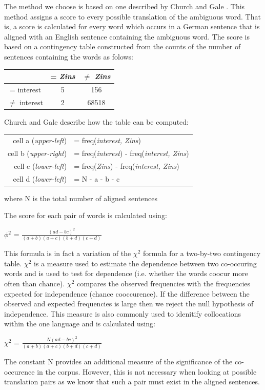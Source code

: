 \documentclass[a4wide,10pt]{article}
\begin{document}
The method we choose is based on one described by 
Church and Gale \cite{gale91word}. 
This method assigns a score to every possible translation of the ambiguous
word. That is, a score is calculated for every word which occurs in a German
sentence that is aligned with an English sentence containing the ambiguous 
word. The score is based on a contingency table constructed from the counts 
of the number of sentences containing the words as folows:

\begin{center}
\begin{tabular}{|c|c|c|}
\hline
				& = {\it Zins} 	& $\neq$ {\it Zins}
\\ \hline
= interest			& 5 		&  156
\\ \hline
$\neq$ interest			& 2 		& 68518 
\\ \hline
\end{tabular}
\end{center}

Church and Gale describe how the table can be computed: 

\begin{tabular}{rl} 
cell a ({\it upper-left})  &= freq({\it interest, Zins})
\\
cell b ({\it upper-right}) &= freq({\it interest}) - freq({\it interest, Zins})
\\
cell c ({\it lower-left})  &= freq({\it Zins}) - freq({\it interest, Zins})
\\
cell d ({\it lower-left})  &= N - a - b - c
\\
\end{tabular} 

where N is the total number of aligned sentences 

The score for each pair of words is calculated using:
\begin{center}
$\phi$$^2$ = $\frac{(ad - bc)^2}{(a + b)(a + c)(b + d)(c + d)}$
\end{center}

This formula is in fact a variation of the $\chi$$^2$ formula for a 
two-by-two contingency table. $\chi$$^2$ is a measure used to estimate the 
dependence between two co-occuring words and is used to test for 
dependence (i.e. whether the words coocur more often than chance). 
$\chi$$^2$ compares the observed frequencies with the frequencies 
expected for independence (chance cooccurence). If the difference between 
the observed and expected frequencies is large then we reject the null 
hypothesis of independence. This measure is also commonly used to idenitify 
collocations within the one language \cite{manning99}
and is calculated using:
\begin{center}
$\chi$$^2$ = $\frac{N(ad - bc)^2}{(a + b)(a + c)(b + d)(c + d)}$
\end{center}
\noindent The constant N provides an additional measure of the significance 
of the co-occurence in the corpus. However, this is not necessary when 
looking at possible translation pairs as we know that such a pair must exist in 
the aligned sentences.     
\end{document}
